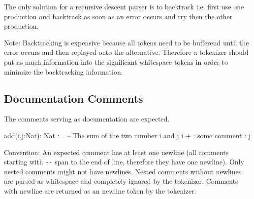 The only solution for a recursive descent parser is to backtrack i.e. first
use one production and backtrack as soon as an error occurs and try then the
other production.

Note: Backtracking is expensive because all tokens need to be bufferend until
the error occurs and then replayed onto the alternative. Therefore a tokenizer
should put as much information into the significant whitespace tokens in order
to minimize the backtracking information.


\subsection{Documentation Comments}

The comments serving as documentation are expected.

\begin{alba}
  add(i,j:Nat): Nat :=
      -- The sum of the two number i and j
    i + {: some comment :} j
\end{alba}

Convention: An expected comment has at least one newline (all comments
starting with \verb!--! span to the end of line, therefore they have one
newline). Only nested comments might not have newlines. Nested comments
without newlines are parsed as whitespace and completely ignored by the
tokenizer. Comments with newline are returned as an newline token by the
tokenizer.





